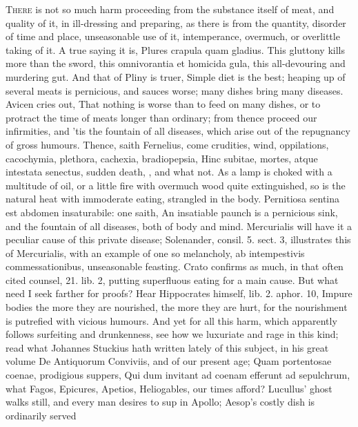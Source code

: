 {\lettrine{T}{here} is not so much harm proceeding from the substance itself of meat,
and quality of it, in ill-dressing and preparing, as there is from the
quantity, disorder of time and place, unseasonable use of it, 
intemperance, overmuch, or overlittle taking of it. A true saying it
is, Plures crapula quam gladius. This gluttony kills more than the
sword, this omnivorantia et homicida gula, this all-devouring and
murdering gut. And that of Pliny is truer, Simple diet is the
best; heaping up of several meats is pernicious, and sauces worse; many
dishes bring many diseases. Avicen cries out, That nothing is
worse than to feed on many dishes, or to protract the time of meats
longer than ordinary; from thence proceed our infirmities, and 'tis the
fountain of all diseases, which arise out of the repugnancy of gross
humours. Thence, saith  Fernelius, come crudities, wind,
oppilations, cacochymia, plethora, cachexia, bradiopepsia, Hinc
subitae, mortes, atque intestata senectus, sudden death, \etc{}, and what
not.
As a lamp is choked with a multitude of oil, or a little fire with
overmuch wood quite extinguished, so is the natural heat with
immoderate eating, strangled in the body. Pernitiosa sentina est
abdomen insaturabile: one saith, An insatiable paunch is a pernicious
sink, and the fountain of all diseases, both of body and mind.
Mercurialis will have it a peculiar cause of this private
disease; Solenander, consil. 5. sect. 3, illustrates this of
Mercurialis, with an example of one so melancholy, ab intempestivis
commessationibus, unseasonable feasting. Crato confirms as much,
in that often cited counsel, 21. lib. 2, putting superfluous eating for
a main cause. But what need I seek farther for proofs? Hear
Hippocrates himself, lib. 2. aphor. 10, Impure bodies the more
they are nourished, the more they are hurt, for the nourishment is
putrefied with vicious humours.
And yet for all this harm, which apparently follows surfeiting and
drunkenness, see how we luxuriate and rage in this kind; read what
Johannes Stuckius hath written lately of this subject, in his great
volume De Antiquorum Conviviis, and of our present age; Quam
portentosae coenae, prodigious suppers, Qui dum invitant ad
coenam efferunt ad sepulchrum, what Fagos, Epicures, Apetios,
Heliogables, our times afford? Lucullus' ghost walks still, and every
man desires to sup in Apollo; Aesop's costly dish is ordinarily served
}
